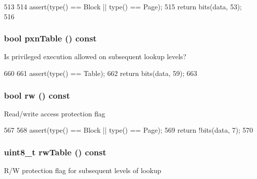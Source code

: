 \begin{DoxyCode}
513         {
514             assert(type() == Block || type() == Page);
515             return bits(data, 53);
516         }
\end{DoxyCode}
\hypertarget{classArmISA_1_1TableWalker_1_1LongDescriptor_a4cabfe03c27a0613a975eb34f5dc311a}{
\subsubsection[{pxnTable}]{\setlength{\rightskip}{0pt plus 5cm}bool pxnTable () const}}
\label{classArmISA_1_1TableWalker_1_1LongDescriptor_a4cabfe03c27a0613a975eb34f5dc311a}
Is privileged execution allowed on subsequent lookup levels? 


\begin{DoxyCode}
660         {
661             assert(type() == Table);
662             return bits(data, 59);
663         }
\end{DoxyCode}
\hypertarget{classArmISA_1_1TableWalker_1_1LongDescriptor_a356d85e4835c16b7b097ddd75df5cfbf}{
\subsubsection[{rw}]{\setlength{\rightskip}{0pt plus 5cm}bool rw () const}}
\label{classArmISA_1_1TableWalker_1_1LongDescriptor_a356d85e4835c16b7b097ddd75df5cfbf}
Read/write access protection flag 


\begin{DoxyCode}
567         {
568             assert(type() == Block || type() == Page);
569             return !bits(data, 7);
570         }
\end{DoxyCode}
\hypertarget{classArmISA_1_1TableWalker_1_1LongDescriptor_a478caeac81ef334cf6698c8ba3f027fb}{
\subsubsection[{rwTable}]{\setlength{\rightskip}{0pt plus 5cm}uint8\_\-t rwTable () const}}
\label{classArmISA_1_1TableWalker_1_1LongDescriptor_a478caeac81ef334cf6698c8ba3f027fb}
R/W protection flag for subsequent levels of lookup 



